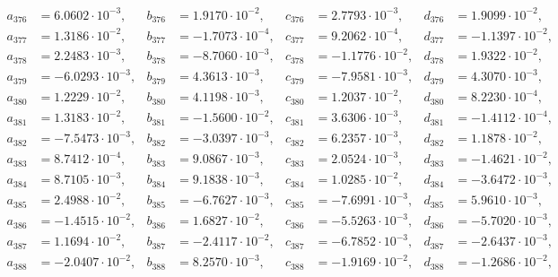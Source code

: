 \begin{align*}
  a_{ 376 } &= 6.0602 \cdot 10^{ -3 }, & b_{ 376 } &= 1.9170 \cdot 10^{ -2 }, & c_{ 376 } &= 2.7793 \cdot 10^{ -3 }, & d_{ 376 } &= 1.9099 \cdot 10^{ -2 }, \\ 
  a_{ 377 } &= 1.3186 \cdot 10^{ -2 }, & b_{ 377 } &= -1.7073 \cdot 10^{ -4 }, & c_{ 377 } &= 9.2062 \cdot 10^{ -4 }, & d_{ 377 } &= -1.1397 \cdot 10^{ -2 }, \\ 
  a_{ 378 } &= 2.2483 \cdot 10^{ -3 }, & b_{ 378 } &= -8.7060 \cdot 10^{ -3 }, & c_{ 378 } &= -1.1776 \cdot 10^{ -2 }, & d_{ 378 } &= 1.9322 \cdot 10^{ -2 }, \\ 
  a_{ 379 } &= -6.0293 \cdot 10^{ -3 }, & b_{ 379 } &= 4.3613 \cdot 10^{ -3 }, & c_{ 379 } &= -7.9581 \cdot 10^{ -3 }, & d_{ 379 } &= 4.3070 \cdot 10^{ -3 }, \\ 
  a_{ 380 } &= 1.2229 \cdot 10^{ -2 }, & b_{ 380 } &= 4.1198 \cdot 10^{ -3 }, & c_{ 380 } &= 1.2037 \cdot 10^{ -2 }, & d_{ 380 } &= 8.2230 \cdot 10^{ -4 }, \\ 
  a_{ 381 } &= 1.3183 \cdot 10^{ -2 }, & b_{ 381 } &= -1.5600 \cdot 10^{ -2 }, & c_{ 381 } &= 3.6306 \cdot 10^{ -3 }, & d_{ 381 } &= -1.4112 \cdot 10^{ -4 }, \\ 
  a_{ 382 } &= -7.5473 \cdot 10^{ -3 }, & b_{ 382 } &= -3.0397 \cdot 10^{ -3 }, & c_{ 382 } &= 6.2357 \cdot 10^{ -3 }, & d_{ 382 } &= 1.1878 \cdot 10^{ -2 }, \\ 
  a_{ 383 } &= 8.7412 \cdot 10^{ -4 }, & b_{ 383 } &= 9.0867 \cdot 10^{ -3 }, & c_{ 383 } &= 2.0524 \cdot 10^{ -3 }, & d_{ 383 } &= -1.4621 \cdot 10^{ -2 }, \\ 
  a_{ 384 } &= 8.7105 \cdot 10^{ -3 }, & b_{ 384 } &= 9.1838 \cdot 10^{ -3 }, & c_{ 384 } &= 1.0285 \cdot 10^{ -2 }, & d_{ 384 } &= -3.6472 \cdot 10^{ -3 }, \\ 
  a_{ 385 } &= 2.4988 \cdot 10^{ -2 }, & b_{ 385 } &= -6.7627 \cdot 10^{ -3 }, & c_{ 385 } &= -7.6991 \cdot 10^{ -3 }, & d_{ 385 } &= 5.9610 \cdot 10^{ -3 }, \\ 
  a_{ 386 } &= -1.4515 \cdot 10^{ -2 }, & b_{ 386 } &= 1.6827 \cdot 10^{ -2 }, & c_{ 386 } &= -5.5263 \cdot 10^{ -3 }, & d_{ 386 } &= -5.7020 \cdot 10^{ -3 }, \\ 
  a_{ 387 } &= 1.1694 \cdot 10^{ -2 }, & b_{ 387 } &= -2.4117 \cdot 10^{ -2 }, & c_{ 387 } &= -6.7852 \cdot 10^{ -3 }, & d_{ 387 } &= -2.6437 \cdot 10^{ -3 }, \\ 
  a_{ 388 } &= -2.0407 \cdot 10^{ -2 }, & b_{ 388 } &= 8.2570 \cdot 10^{ -3 }, & c_{ 388 } &= -1.9169 \cdot 10^{ -2 }, & d_{ 388 } &= -1.2686 \cdot 10^{ -2 }, \\ 

\end{align*}
